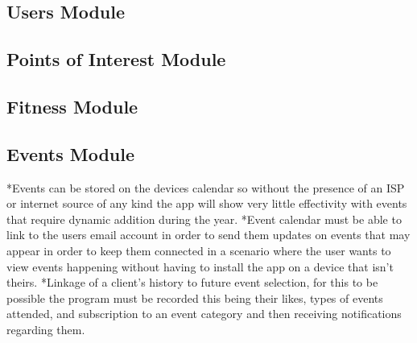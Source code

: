 \documentclass[11pt]{article}
\begin{document}
  \subsection{Users Module}
  
  \subsection{Points of Interest Module}
  
  \subsection{Fitness Module}

  \subsection{Events Module}
  *Events can be stored on the devices calendar so without the presence of an ISP or internet source of any kind the app will show very   little effectivity with events that require dynamic addition during the year.
  *Event calendar must be able to link to the users email account in order to send them updates on events that may appear in order to     keep them connected in a scenario where the user wants to view events happening without having to install the app on a device that       isn’t theirs.
  *Linkage of a client’s history to future event selection, for this to be possible the program must be recorded this being their likes,   types of events attended, and subscription to an event category and then receiving notifications regarding them.

  
  
 
\end{document}
